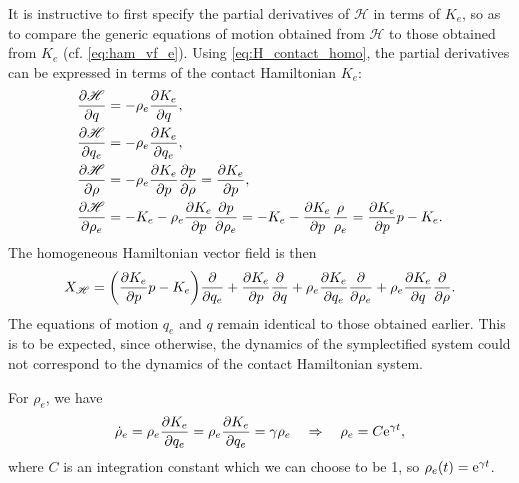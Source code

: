 It is instructive to first specify the partial derivatives of \(\mathscr{H}\) in terms of \(K_e\), so as to compare the generic equations of motion obtained from \(\mathscr{H}\) to those obtained from \(K_e\) (cf. \cref{eq:ham_vf_e}). Using \cref{eq:H_contact_homo}, the partial derivatives can be expressed in terms of the contact Hamiltonian \(K_e\):
\begin{equation}
    \begin{split}
        \pdv{\mathscr{H}}{q} &= -\rho_e \pdv{K_e}{q}, \\
        \pdv{\mathscr{H}}{q_e} &= -\rho_e \pdv{K_e}{q_e}, \\
        \pdv{\mathscr{H}}{\rho} &= -\rho_e \pdv{K_e}{p}\pdv{p}{\rho} = \pdv{K_e}{p}, \\
        \pdv{\mathscr{H}}{\rho_e} &= -K_e - \rho_e \pdv{K_e}{p}\pdv{p}{\rho_e} = -K_e - \pdv{K_e}{p}\frac{\rho}{\rho_e} = \pdv{K_e}{p}p - K_e.\\
    \end{split}
\end{equation}
The homogeneous Hamiltonian vector field is then
\begin{equation}
    X_\mathscr{H} = \qty(\pdv{K_e}{p}p - K_e)\pdv{}{q_e}
                    + \pdv{K_e}{p}\pdv{}{q}
                    + \rho_e\pdv{K_e}{q_e}\pdv{}{\rho_e}
                    + \rho_e\pdv{K_e}{q}\pdv{}{\rho}.
    \label{eq:hom_ham_vf}
\end{equation}
The equations of motion \(q_e\) and \(q\) remain identical to those obtained earlier. This is to be expected, since otherwise, the dynamics of the symplectified system could not correspond to the dynamics of the contact Hamiltonian system. 

For \(\rho_e\), we have
\begin{equation}
     \dot{\rho}_e = \rho_e \pdv{K_e}{q_e} = \rho_e \pdv{K_e}{q_e}  = \gamma\rho_e \quad \Rightarrow \quad \rho_e = C\mathrm{e}^{\gamma t},
\end{equation} 
where \(C\) is an integration constant which we can choose to be 1, so \(\rho_e(t) = \mathrm{e}^{\gamma t}\).

